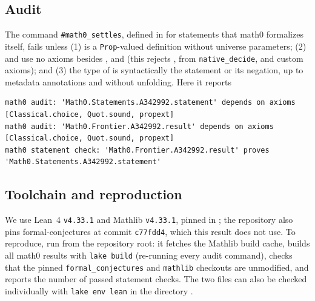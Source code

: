 \documentclass[11pt]{amsart}
\theoremstyle{plain}
\theoremstyle{definition}
\begin{document}
\subsection*{Audit}
The command \texttt{\#math0\_settles}, defined in  for statements that math0 formalizes itself, fails unless (1)  is a \texttt{Prop}-valued definition without universe parameters; (2)  and  use no axioms besides ,  and  (this rejects ,  from \texttt{native\_decide}, and custom axioms); and (3) the type of  is syntactically the statement or its negation, up to metadata annotations and without unfolding. Here it reports
\begin{lstlisting}[basicstyle=\ttfamily\tiny]
math0 audit: 'Math0.Statements.A342992.statement' depends on axioms [Classical.choice, Quot.sound, propext]
math0 audit: 'Math0.Frontier.A342992.result' depends on axioms [Classical.choice, Quot.sound, propext]
math0 statement check: 'Math0.Frontier.A342992.result' proves 'Math0.Statements.A342992.statement'
\end{lstlisting}

\subsection*{Toolchain and reproduction}
We use Lean~4 \cite{Lean4} \texttt{v4.33.1} and Mathlib \cite{Mathlib} \texttt{v4.33.1}, pinned in ; the repository also pins formal-conjectures \cite{FC} at commit \texttt{c77fdd4}, which this result does not use.
To reproduce, run  from the repository root: it fetches the Mathlib build cache, builds all math0 results with \texttt{lake build} (re-running every audit command), checks that the pinned \texttt{formal\_conjectures} and \texttt{mathlib} checkouts are unmodified, and reports the number of passed statement checks. The two files can also be checked individually with \texttt{lake env lean} in the directory .
\end{document}
